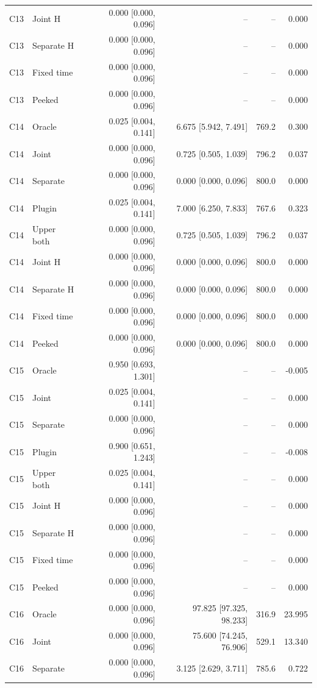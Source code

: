 \begin{longtable}{llrrrr}
C13 & Joint H & 0.000 [0.000, 0.096] & -- & -- & 0.000\\
C13 & Separate H & 0.000 [0.000, 0.096] & -- & -- & 0.000\\
C13 & Fixed time & 0.000 [0.000, 0.096] & -- & -- & 0.000\\
C13 & Peeked & 0.000 [0.000, 0.096] & -- & -- & 0.000\\
C14 & Oracle & 0.025 [0.004, 0.141] & 6.675 [5.942, 7.491] & 769.2 & 0.300\\
C14 & Joint & 0.000 [0.000, 0.096] & 0.725 [0.505, 1.039] & 796.2 & 0.037\\
C14 & Separate & 0.000 [0.000, 0.096] & 0.000 [0.000, 0.096] & 800.0 & 0.000\\
C14 & Plugin & 0.025 [0.004, 0.141] & 7.000 [6.250, 7.833] & 767.6 & 0.323\\
C14 & Upper both & 0.000 [0.000, 0.096] & 0.725 [0.505, 1.039] & 796.2 & 0.037\\
C14 & Joint H & 0.000 [0.000, 0.096] & 0.000 [0.000, 0.096] & 800.0 & 0.000\\
C14 & Separate H & 0.000 [0.000, 0.096] & 0.000 [0.000, 0.096] & 800.0 & 0.000\\
C14 & Fixed time & 0.000 [0.000, 0.096] & 0.000 [0.000, 0.096] & 800.0 & 0.000\\
C14 & Peeked & 0.000 [0.000, 0.096] & 0.000 [0.000, 0.096] & 800.0 & 0.000\\
C15 & Oracle & 0.950 [0.693, 1.301] & -- & -- & -0.005\\
C15 & Joint & 0.025 [0.004, 0.141] & -- & -- & 0.000\\
C15 & Separate & 0.000 [0.000, 0.096] & -- & -- & 0.000\\
C15 & Plugin & 0.900 [0.651, 1.243] & -- & -- & -0.008\\
C15 & Upper both & 0.025 [0.004, 0.141] & -- & -- & 0.000\\
C15 & Joint H & 0.000 [0.000, 0.096] & -- & -- & 0.000\\
C15 & Separate H & 0.000 [0.000, 0.096] & -- & -- & 0.000\\
C15 & Fixed time & 0.000 [0.000, 0.096] & -- & -- & 0.000\\
C15 & Peeked & 0.000 [0.000, 0.096] & -- & -- & 0.000\\
C16 & Oracle & 0.000 [0.000, 0.096] & 97.825 [97.325, 98.233] & 316.9 & 23.995\\
C16 & Joint & 0.000 [0.000, 0.096] & 75.600 [74.245, 76.906] & 529.1 & 13.340\\
C16 & Separate & 0.000 [0.000, 0.096] & 3.125 [2.629, 3.711] & 785.6 & 0.722\\

\end{longtable}
